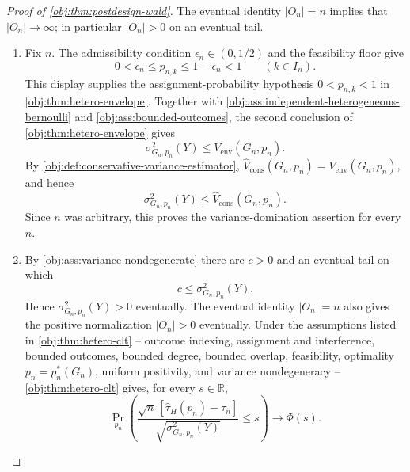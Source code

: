 \documentclass[11pt]{article}
\begin{document}
\begin{proof}[Proof of \cref{obj:thm:postdesign-wald}]
The eventual identity \(|O_n|=n\) implies that \(|O_n|\to\infty\); in particular \(|O_n|>0\) on an eventual tail.

\begin{enumerate}
\item Fix \(n\).  The admissibility condition \(\epsilon_n\in(0,1/2)\) and the feasibility floor give
\[
0<\epsilon_n\le p_{n,k}\le 1-\epsilon_n<1
\qquad(k\in I_n).
\]
This display supplies the assignment-probability hypothesis \(0<p_{n,k}<1\) in \cref{obj:thm:hetero-envelope}.  Together with \cref{obj:ass:independent-heterogeneous-bernoulli} and \cref{obj:ass:bounded-outcomes}, the second conclusion of \cref{obj:thm:hetero-envelope} gives
\[
\sigma^2_{G_n,p_n}(Y)\le V_{\mathrm{env}}(G_n,p_n).
\]
By \cref{obj:def:conservative-variance-estimator},
\(\widehat V_{\mathrm{cons}}(G_n,p_n)=V_{\mathrm{env}}(G_n,p_n)\), and hence
\[
\sigma^2_{G_n,p_n}(Y)\le \widehat V_{\mathrm{cons}}(G_n,p_n).
\]
Since \(n\) was arbitrary, this proves the variance-domination assertion for every \(n\).

\item By \cref{obj:ass:variance-nondegenerate} there are \(c>0\) and an eventual tail on which
\[
c\le \sigma^2_{G_n,p_n}(Y).
\]
Hence \(\sigma^2_{G_n,p_n}(Y)>0\) eventually.  The eventual identity
\(|O_n|=n\) also gives the positive normalization \(|O_n|>0\) eventually.
Under the assumptions listed in \cref{obj:thm:hetero-clt} -- outcome indexing,
assignment and interference, bounded outcomes, bounded degree, bounded overlap,
feasibility, optimality \(p_n=p_n^*(G_n)\), uniform positivity, and variance
nondegeneracy -- \cref{obj:thm:hetero-clt} gives, for every \(s\in\mathbb R\),
\[
\Pr_{p_n}\!\left(
\frac{\sqrt n\,[\widehat\tau_H(p_n)-\tau_n]}
{\sqrt{\sigma^2_{G_n,p_n}(Y)}}\le s
\right)
\longrightarrow \Phi(s).
\]


\end{enumerate}
\end{proof}
\end{document}
